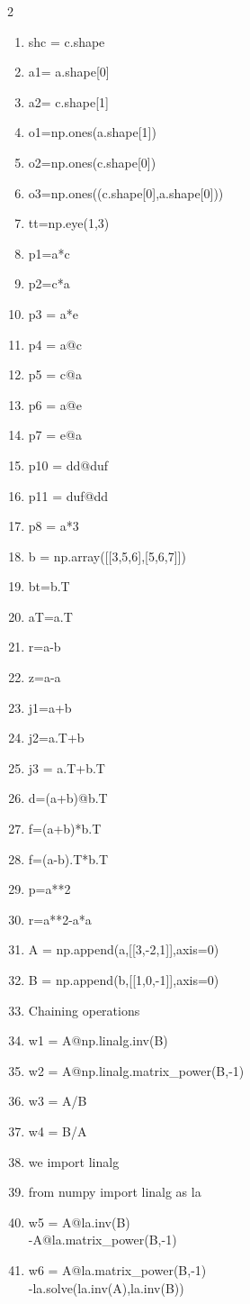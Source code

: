 \begin{enumerate}
\begin{multicols}{2}
{\begin{enumerate}
\item shc = c.shape
\item a1= a.shape[0]
\item a2= c.shape[1]
\item o1=np.ones(a.shape[1])
\item o2=np.ones(c.shape[0])
\item o3=np.ones((c.shape[0],a.shape[0]))
\item tt=np.eye(1,3)
\item p1=a*c
\item p2=c*a
\item p3 = a*e
\item p4 = a@c
\item p5 = c@a
\item p6 = a@e
\item p7 = e@a
\item p10 = dd@duf
\item p11 = duf@dd
\item p8 = a*3
\item b = np.array([[3,5,6],[5,6,7]])
\item bt=b.T
\item aT=a.T
\item r=a-b
\item z=a-a
\item j1=a+b
\item j2=a.T+b
\item j3 = a.T+b.T
\item d=(a+b)@b.T
\item f=(a+b)*b.T
\item f=(a-b).T*b.T
\item p=a**2
\item r=a**2-a*a
\item A = np.append(a,[[3,-2,1]],axis=0)
\item B = np.append(b,[[1,0,-1]],axis=0)
\item[*] Chaining operations
\item w1 = A@np.linalg.inv(B)
\item w2 = A@np.linalg.matrix\_power(B,-1)
\item w3 = A/B
\item w4 = B/A
\item[*] we import linalg
\item from numpy import linalg as la
\item w5 = A@la.inv(B) \\ -A@la.matrix\_power(B,-1)
\item w6 = A@la.matrix\_power(B,-1)\\-la.solve(la.inv(A),la.inv(B))

\end{enumerate}}
\end{multicols}
\end{enumerate}
